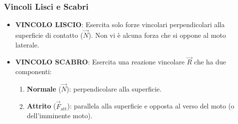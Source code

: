 \subsubsection{Vincoli Lisci e Scabri}

\begin{itemize}
    \item \textbf{VINCOLO LISCIO}: Esercita solo forze vincolari perpendicolari alla superficie di contatto ($\vec{N}$). Non vi è alcuna forza che si oppone al moto laterale.
    \item \textbf{VINCOLO SCABRO}: Esercita una reazione vincolare $\vec{R}$ che ha due componenti:
    \begin{enumerate}
        \item \textbf{Normale} ($\vec{N}$): perpendicolare alla superficie.
        \item \textbf{Attrito} ($\vec{F}_{\text{att}}$): parallela alla superficie e opposta al verso del moto (o dell'imminente moto).
    \end{enumerate}
\end{itemize}

